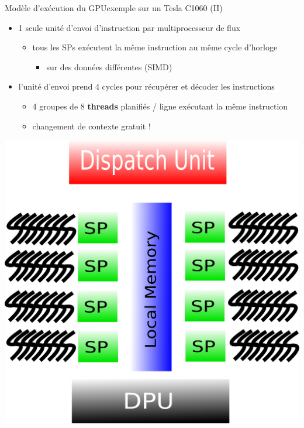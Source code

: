 \documentclass[11pt,mathserif]{beamer}
\begin{document}
\begin{frame}{Modèle d'exécution du GPU}{exemple sur un Tesla C1060 (II)}
\begin{minipage}[c]{0.49\linewidth}
\begin{itemize}
  \item 1 seule unité d'envoi d'instruction par multiprocesseur de flux
    \begin{itemize}
      \item tous les SPs exécutent la même instruction au même cycle d'horloge
        \begin{itemize}
          \item sur des données différentes (SIMD)
        \end{itemize}
    \end{itemize}
  \item l'unité d'envoi prend 4 cycles pour récupérer et décoder les instructions
    \begin{itemize}
      \item 4 groupes de 8 {\bf threads} planifiés / ligne
    exécutant la même instruction
      \item changement de contexte gratuit !
    \end{itemize}
\end{itemize}
\end{minipage}
\begin{minipage}[c]{0.49\linewidth}
\begin{center}
  \includegraphics[width=0.9\linewidth]{fig/GPUArchi8Thread.eps}
\end{center}
\end{minipage}
\end{frame}
\end{document}
